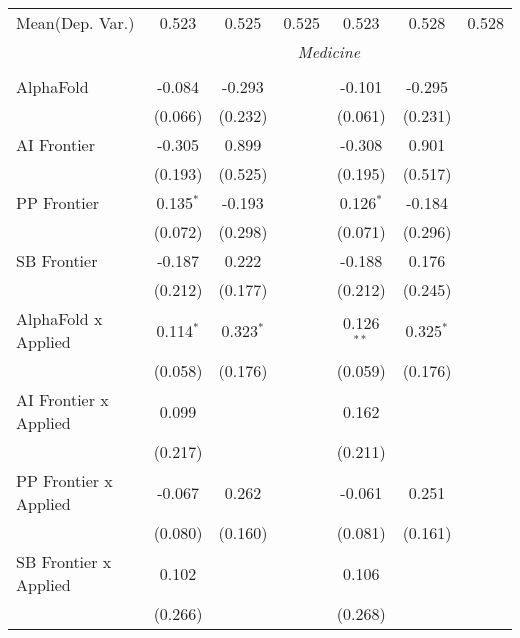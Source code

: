 \begin{tabular}{lcccccc}
Mean(Dep. Var.) & 0.523 & 0.525 & 0.525 & 0.523 & 0.528 & 0.528 \\
 & \multicolumn{6}{c}{\textit{Medicine}} \\ \\
   AlphaFold                    & -0.084      & -0.293      &             & -0.101       & -0.295      &   \\   
                                & (0.066)     & (0.232)     &             & (0.061)      & (0.231)     &   \\   
   AI Frontier                  & -0.305      & 0.899       &             & -0.308       & 0.901       &   \\   
                                & (0.193)     & (0.525)     &             & (0.195)      & (0.517)     &   \\   
   PP Frontier                  & 0.135$^{*}$ & -0.193      &             & 0.126$^{*}$  & -0.184      &   \\   
                                & (0.072)     & (0.298)     &             & (0.071)      & (0.296)     &   \\   
   SB Frontier                  & -0.187      & 0.222       &             & -0.188       & 0.176       &   \\   
                                & (0.212)     & (0.177)     &             & (0.212)      & (0.245)     &   \\   
   AlphaFold x Applied          & 0.114$^{*}$ & 0.323$^{*}$ &             & 0.126$^{**}$ & 0.325$^{*}$ &   \\   
                                & (0.058)     & (0.176)     &             & (0.059)      & (0.176)     &   \\   
   AI Frontier x Applied        & 0.099       &             &             & 0.162        &             &   \\   
                                & (0.217)     &             &             & (0.211)      &             &   \\   
   PP Frontier x Applied        & -0.067      & 0.262       &             & -0.061       & 0.251       &   \\   
                                & (0.080)     & (0.160)     &             & (0.081)      & (0.161)     &   \\   
   SB Frontier x Applied        & 0.102       &             &             & 0.106        &             &   \\   
                                & (0.266)     &             &             & (0.268)      &             &   \\   

\end{tabular}
